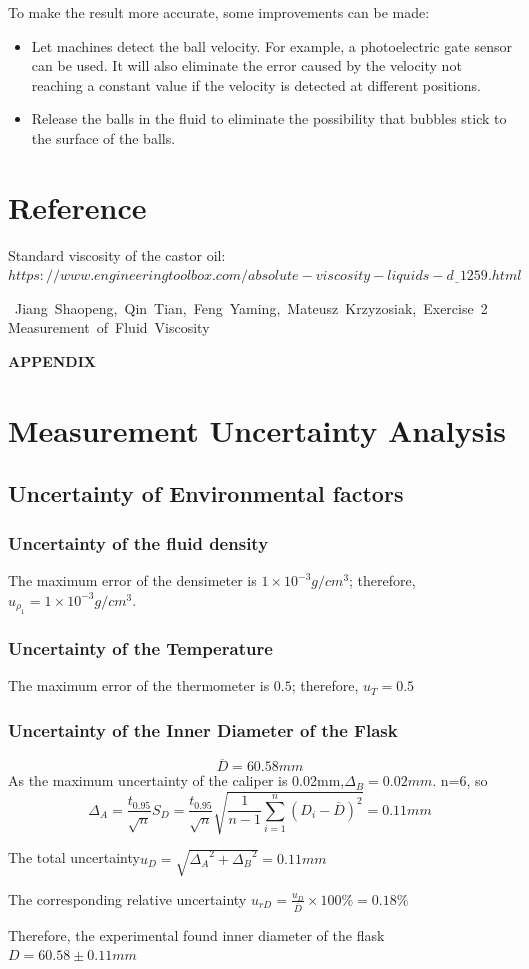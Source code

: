 \documentclass[12pt,a4paper]{article}
\begin{document}
To make the result more accurate, some improvements can be made:
\begin{itemize}
    \item Let machines detect the ball velocity. For example, a photoelectric gate sensor can be used. It will also eliminate the error caused by the velocity not reaching a constant value if the velocity is detected at different positions.
    \item Release the balls in the fluid to eliminate the possibility that bubbles stick to the surface of the balls.
\end{itemize}

\section{Reference}
\qquad [1] Standard viscosity of the castor oil: $https://www.engineeringtoolbox.com/absolute-viscosity-liquids-d\underline{~~}1259.html$\par
[2] Jiang Shaopeng, Qin Tian, Feng Yaming, Mateusz Krzyzosiak, Exercise 2 Measurement of Fluid Viscosity
	
	


\newpage
{\LARGE\textbf{APPENDIX}}
\setcounter{section}{0}
\renewcommand\thesection{\Alph{section}}

\section{Measurement Uncertainty Analysis}
\subsection{Uncertainty of Environmental factors}

\subsubsection{Uncertainty of the fluid density}
The maximum error of the densimeter is $1\times 10^{-3}g/cm^3$; therefore, $u_{\rho_1}=1\times 10^{-3} g/cm^3$.

\subsubsection{Uncertainty of the Temperature}
The maximum error of the thermometer is $0.5$\textcelsius; therefore, $u_T=0.5$\textcelsius

\subsubsection{Uncertainty of the Inner Diameter of the Flask}
$$\overline{D}=60.58mm$$
As the maximum uncertainty of the caliper is 0.02mm,$\Delta_B=0.02mm$. n=6, so $$\Delta_A=\frac{t_{0.95}}{\sqrt{n}}S_D=\frac{t_{0.95}}{\sqrt{n}}\sqrt{\frac{1}{n-1}\sum^n_{i=1}(D_i-\overline{D})^2}=0.11mm$$ \par 
The total uncertainty$u_D=\sqrt{{\Delta_A}^2+{\Delta_B}^2}=0.11mm$\par 
The corresponding relative uncertainty $u_{rD}=\frac{u_D}{\overline{D}}\times 100\%=0.18\%$ \par 
Therefore, the experimental found inner diameter of the flask $D=60.58\pm 0.11mm$
\end{document}
